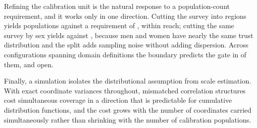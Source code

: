 Refining the calibration unit is the natural response to a population-count
requirement, and it works only in one direction. Cutting the survey into regions yields \DomRegK{} populations against a
requirement of \DomRegReq, within reach; cutting the same survey by sex yields
\DomSexK{} against \DomSexReq, because men and women have nearly the same trust
distribution and the split adds sampling noise without adding dispersion. Across
\DomConfigs{} configurations spanning \DomTypes{} domain definitions the
boundary predicts the gate in \DomCorrect{} of them, and \DomOpen{} open.

Finally, a simulation isolates the distributional assumption from
scale estimation. With exact coordinate variances throughout, mismatched
correlation structures cost simultaneous coverage in a direction that is
predictable for cumulative distribution functions, and the cost grows with the
number of coordinates carried simultaneously rather than shrinking with the
number of calibration populations.
